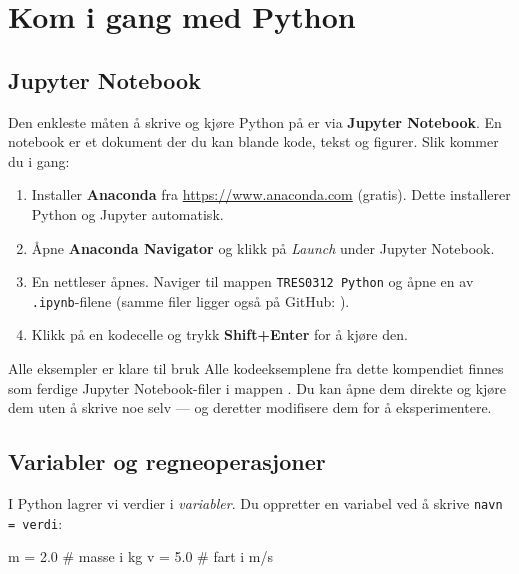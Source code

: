 \documentclass[../Main.tex]{subfiles}
\begin{document}
\chapter{Kom i gang med Python}
\label{app:python}


\section{Jupyter Notebook}

Den enkleste måten å skrive og kjøre Python på er via \textbf{Jupyter Notebook}. En notebook er et dokument der du kan blande kode, tekst og figurer. Slik kommer du i gang:

\begin{enumerate}
    \item Installer \textbf{Anaconda} fra \url{https://www.anaconda.com} (gratis). Dette installerer Python og Jupyter automatisk.
    \item Åpne \textbf{Anaconda Navigator} og klikk på \textit{Launch} under Jupyter Notebook.
    \item En nettleser åpnes. Naviger til mappen \texttt{TRES0312 Python} og åpne en av \texttt{.ipynb}-filene (samme filer ligger også på GitHub: \pyfolderlink).
    \item Klikk på en kodecelle og trykk \textbf{Shift+Enter} for å kjøre den.
\end{enumerate}

\begin{mymerk*}{Alle eksempler er klare til bruk}
Alle kodeeksemplene fra dette kompendiet finnes som ferdige Jupyter Notebook-filer i mappen \pyfolderlink. Du kan åpne dem direkte og kjøre dem uten å skrive noe selv — og deretter modifisere dem for å eksperimentere.
\end{mymerk*}

\section{Variabler og regneoperasjoner}

I Python lagrer vi verdier i \emph{variabler}. Du oppretter en variabel ved å skrive \texttt{navn = verdi}:

\begin{pythonkode}
m = 2.0    # masse i kg
v = 5.0    # fart i m/s
\end{pythonkode}
\end{document}
